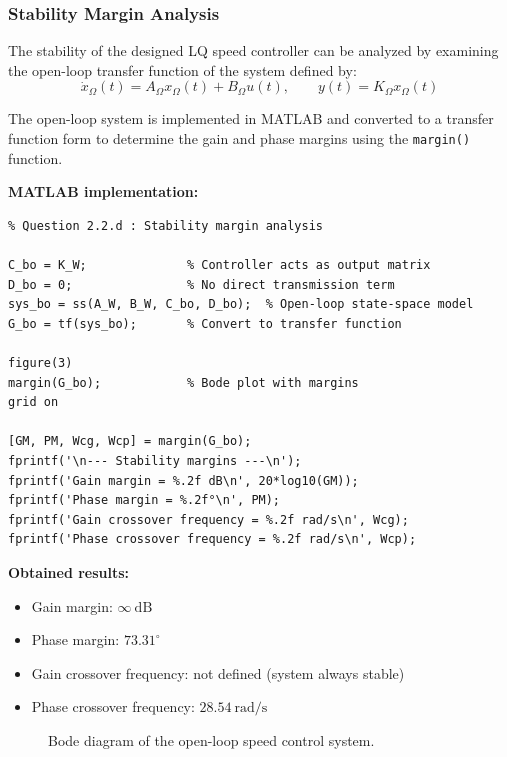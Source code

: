 \documentclass{rapportCS}
\begin{document}
\subsubsection{Stability Margin Analysis}

The stability of the designed LQ speed controller can be analyzed by examining the open-loop transfer function of the system defined by:
\begin{equation*}
\dot{x}_\Omega(t) = A_\Omega x_\Omega(t) + B_\Omega u(t),
\qquad
y(t) = K_\Omega x_\Omega(t)
\end{equation*}

The open-loop system is implemented in MATLAB and converted to a transfer function form to determine the gain and phase margins using the \texttt{margin()} function.

\noindent\textbf{MATLAB implementation:}
\begin{verbatim}
% Question 2.2.d : Stability margin analysis

C_bo = K_W;              % Controller acts as output matrix
D_bo = 0;                % No direct transmission term
sys_bo = ss(A_W, B_W, C_bo, D_bo);  % Open-loop state-space model
G_bo = tf(sys_bo);       % Convert to transfer function

figure(3)
margin(G_bo);            % Bode plot with margins
grid on

[GM, PM, Wcg, Wcp] = margin(G_bo);
fprintf('\n--- Stability margins ---\n');
fprintf('Gain margin = %.2f dB\n', 20*log10(GM));
fprintf('Phase margin = %.2f°\n', PM);
fprintf('Gain crossover frequency = %.2f rad/s\n', Wcg);
fprintf('Phase crossover frequency = %.2f rad/s\n', Wcp);
\end{verbatim}

\noindent\textbf{Obtained results:}
\begin{itemize}
    \item Gain margin: $\infty~\mathrm{dB}$
    \item Phase margin: $73.31^{\circ}$
    \item Gain crossover frequency: not defined (system always stable)
    \item Phase crossover frequency: $28.54~\mathrm{rad/s}$
\end{itemize}

\begin{figure}[H]
    \centering
    \caption{Bode diagram of the open-loop speed control system.}
    \label{fig:bode_speed_loop}
\end{figure}
\end{document}
